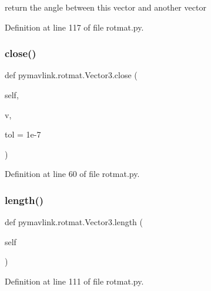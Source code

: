 \begin{DoxyVerb}return the angle between this vector and another vector\end{DoxyVerb}
 

Definition at line 117 of file rotmat.\+py.

\mbox{\label{classpymavlink_1_1rotmat_1_1Vector3_a53281a75b654ebb6934af427409f4643}} 
\subsubsection{\texorpdfstring{close()}{close()}}
{\footnotesize\ttfamily def pymavlink.\+rotmat.\+Vector3.\+close (\begin{DoxyParamCaption}\item[{}]{self,  }\item[{}]{v,  }\item[{}]{tol = {\ttfamily 1e-\/7} }\end{DoxyParamCaption})}



Definition at line 60 of file rotmat.\+py.

\mbox{\label{classpymavlink_1_1rotmat_1_1Vector3_a43dcff386a802ebcc77d224fc0078bb0}} 
\subsubsection{\texorpdfstring{length()}{length()}}
{\footnotesize\ttfamily def pymavlink.\+rotmat.\+Vector3.\+length (\begin{DoxyParamCaption}\item[{}]{self }\end{DoxyParamCaption})}



Definition at line 111 of file rotmat.\+py.

\mbox{\label{classpymavlink_1_1rotmat_1_1Vector3_a4921c4f57ba345e4882fcfd2e2619a26}} 
